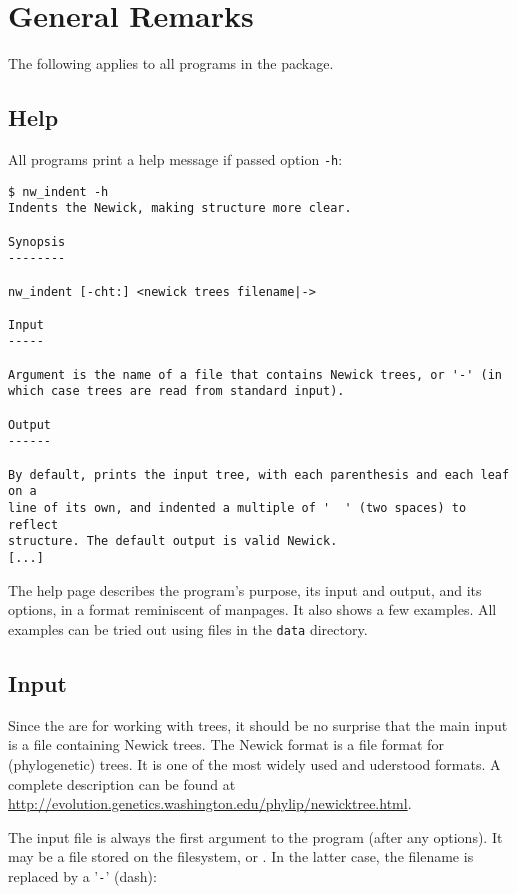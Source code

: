 
\chapter{General Remarks}
\label{chap_general}

The following applies to all programs in the \nutils{} package.

\section{Help}
\label{sct_help}

All programs print a help message if passed option \texttt{-h}:

\begin{samepage}
\begin{verbatim}
$ nw_indent -h
Indents the Newick, making structure more clear.

Synopsis
--------

nw_indent [-cht:] <newick trees filename|->

Input
-----

Argument is the name of a file that contains Newick trees, or '-' (in
which case trees are read from standard input).

Output
------

By default, prints the input tree, with each parenthesis and each leaf on a
line of its own, and indented a multiple of '  ' (two spaces) to reflect
structure. The default output is valid Newick.
[...]
\end{verbatim}
\end{samepage}
The help page describes the program's purpose, its input and output, and its
options, in a format reminiscent of \unix{} manpages. It also shows a few
examples. All examples can be tried out using files in the \texttt{data}
directory.

\section{Input}
\label{sct_input}

Since the \nutils{} are for working with trees, it should be no surprise
that the main input is a file containing Newick trees. The Newick format is a
file format for (phylogenetic) trees. It is one of the most widely used and
uderstood formats.  A complete description can be found at
\url{http://evolution.genetics.washington.edu/phylip/newicktree.html}.

The input file is always the first argument to the program (after any
options). It may be a file stored on the filesystem, or \stdin{}. In the
latter case, the filename is replaced by a '\texttt{-}' (dash):

